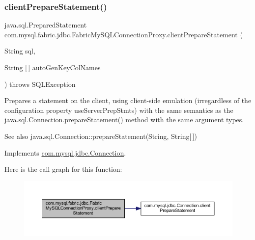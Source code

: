 \subsubsection{\texorpdfstring{client\+Prepare\+Statement()}{clientPrepareStatement()}\hspace{0.1cm}{\footnotesize\ttfamily [6/6]}}
{\footnotesize\ttfamily java.\+sql.\+Prepared\+Statement com.\+mysql.\+fabric.\+jdbc.\+Fabric\+My\+S\+Q\+L\+Connection\+Proxy.\+client\+Prepare\+Statement (\begin{DoxyParamCaption}\item[{String}]{sql,  }\item[{String \mbox{[}$\,$\mbox{]}}]{auto\+Gen\+Key\+Col\+Names }\end{DoxyParamCaption}) throws S\+Q\+L\+Exception}

Prepares a statement on the client, using client-\/side emulation (irregardless of the configuration property \textquotesingle{}use\+Server\+Prep\+Stmts\textquotesingle{}) with the same semantics as the java.\+sql.\+Connection.\+prepare\+Statement() method with the same argument types.

\begin{DoxySeeAlso}{See also}
java.\+sql.\+Connection\+::prepare\+Statement(\+String, String\mbox{[}$\,$\mbox{]}) 
\end{DoxySeeAlso}


Implements \mbox{\hyperlink{interfacecom_1_1mysql_1_1jdbc_1_1_connection_a452a8703aca3c45fdafe3e1a5093b8b5}{com.\+mysql.\+jdbc.\+Connection}}.

Here is the call graph for this function\+:\nopagebreak
\begin{figure}[H]
\begin{center}
\leavevmode
\includegraphics[width=350pt]{classcom_1_1mysql_1_1fabric_1_1jdbc_1_1_fabric_my_s_q_l_connection_proxy_ac36e9430178828a18476f6ef8cd0b28f_cgraph}
\end{center}
\end{figure}
\mbox{\label{classcom_1_1mysql_1_1fabric_1_1jdbc_1_1_fabric_my_s_q_l_connection_proxy_a061c926e5ae98b3b992ee1a83a44847d}} 
